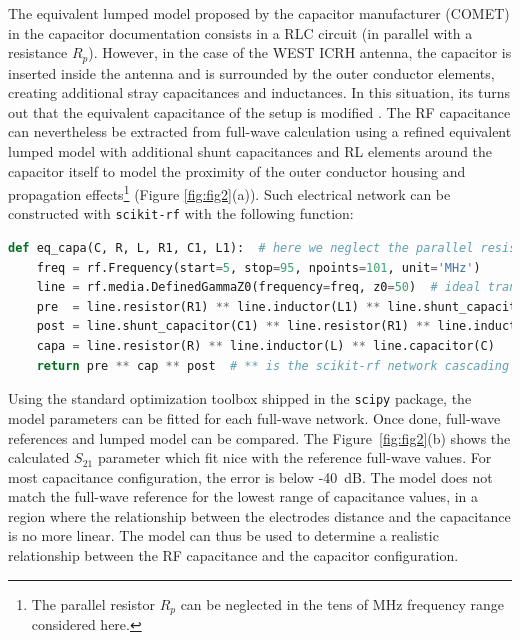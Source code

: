 \documentclass{aip-cp}
\begin{document}
	
	The equivalent lumped model proposed by the capacitor manufacturer (COMET) in the capacitor documentation consists in a RLC circuit (in parallel with a resistance $R_p$). 
	However, in the case of the WEST ICRH antenna, the capacitor is inserted inside the antenna and is surrounded by the outer conductor elements, creating additional stray capacitances and inductances. In this situation, its turns out that the equivalent capacitance of the setup is modified \cite{Helou2018_PhD}. The RF capacitance can nevertheless be extracted from full-wave calculation using a refined equivalent lumped model with additional shunt capacitances and RL elements around the capacitor itself to model the proximity of the outer conductor housing and propagation effects\footnote{The parallel resistor $R_p$ can be neglected in the tens of MHz frequency range considered here.} (Figure \ref{fig:fig2}(a)). Such electrical network can be constructed with \texttt{scikit-rf} with the following function:
	
	\begin{lstlisting}[language=Python]
	def eq_capa(C, R, L, R1, C1, L1):  # here we neglect the parallel resistance R_p
	freq = rf.Frequency(start=5, stop=95, npoints=101, unit='MHz')
	line = rf.media.DefinedGammaZ0(frequency=freq, z0=50)  # ideal transmission line media
	pre  = line.resistor(R1) ** line.inductor(L1) ** line.shunt_capacitor(C1)
	post = line.shunt_capacitor(C1) ** line.resistor(R1) ** line.inductor(L1)
	capa = line.resistor(R) ** line.inductor(L) ** line.capacitor(C)
	return pre ** cap ** post  # ** is the scikit-rf network cascading operator
	\end{lstlisting}
	
	Using the standard optimization toolbox shipped in the \texttt{scipy} package, the model parameters can be fitted for each full-wave network. Once done, full-wave references and lumped model can be compared. The Figure~\ref{fig:fig2}(b) shows the calculated $S_{21}$ parameter which fit nice with the reference full-wave values. For most capacitance configuration, the error is below -40~dB. The model does not match the full-wave reference for the lowest range of capacitance values, in a region where the relationship between the electrodes distance and the capacitance is no more linear. The model can thus be used to determine a realistic relationship between the RF capacitance and the capacitor configuration.
	
\end{document}
